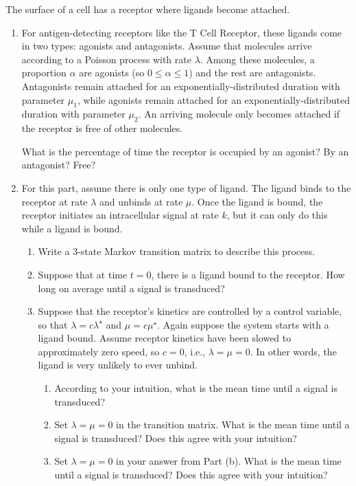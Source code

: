 \documentclass[12pt,letterpaper]{article}
\begin{document}
The surface of a cell has a receptor where ligands become attached. 

\begin{enumerate}






\item For antigen-detecting receptors like the T Cell Receptor, these ligands come in two types: agonists and antagonists. Assume that molecules arrive according to a Poisson process with rate $\lambda$. Among these molecules, a proportion $\alpha$ are agonists (so $0\leq \alpha \leq 1$) and the rest are antagonists. Antagonists remain attached for an exponentially-distributed duration with parameter $\mu_1$, while agonists remain attached for an exponentially-distributed duration with parameter $\mu_2$. An arriving molecule only becomes attached if the receptor is free of other molecules. 

What is the percentage of time the receptor is occupied by an agonist? By an antagonist? Free?

\item For this part, assume there is only one type of ligand. The ligand binds to the receptor at rate $\lambda$ and unbinds at rate $\mu$. Once the ligand is bound, the receptor initiates an intracellular signal at rate $k$, but it can only do this while a ligand is bound. 

\begin{enumerate}
\item Write a 3-state Markov transition matrix to describe this process. 

\item Suppose that at time $t=0$, there is a ligand bound to the receptor. How long on average until a signal is transduced?

\item Suppose that the receptor's kinetics are controlled by a control variable, so that $\lambda = c \lambda^\star$ and $\mu = c\mu^\star$. Again suppose the system starts with a ligand bound. Assume receptor kinetics have been slowed to approximately zero speed, so $c=0$, i.e., $\lambda=\mu=0$. In other words, the ligand is very unlikely to ever unbind.

\begin{enumerate}
\item According to your intuition, what is the mean time until a signal is transduced?
\item Set $\lambda=\mu=0$ in the transition matrix. What is the mean time until a signal is transduced? Does this agree with your intuition?
\item Set $\lambda=\mu=0$ in your answer from Part (b). What is the mean time until a signal is transduced? Does this agree with your intuition?
\end{enumerate}

\end{enumerate}


\end{enumerate}
\end{document}
